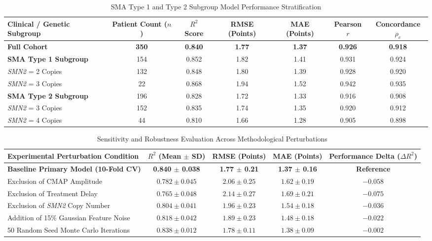 \documentclass[journal]{IEEEtran}
\begin{document}
\clearpage

\begin{table}[!t]
\caption{SMA Type 1 and Type 2 Subgroup Model Performance Stratification}
\label{tab:subgroup}
\centering
\begin{tabular}{lcccccc}
\toprule
\textbf{Clinical / Genetic Subgroup} & \textbf{Patient Count ($n$)} & \textbf{$R^2$ Score} & \textbf{RMSE (Points)} & \textbf{MAE (Points)} & \textbf{Pearson $r$} & \textbf{Concordance $\rho_c$} \\
\midrule
\textbf{Full Cohort} & \textbf{350} & \textbf{0.840} & \textbf{1.77} & \textbf{1.37} & \textbf{0.926} & \textbf{0.918} \\
\textbf{SMA Type 1 Subgroup} & 154 & 0.852 & 1.82 & 1.41 & 0.931 & 0.924 \\
\quad \textit{SMN2} = 2 Copies & 132 & 0.848 & 1.80 & 1.39 & 0.928 & 0.920 \\
\quad \textit{SMN2} = 3 Copies & 22 & 0.868 & 1.94 & 1.52 & 0.942 & 0.935 \\
\textbf{SMA Type 2 Subgroup} & 196 & 0.828 & 1.72 & 1.33 & 0.916 & 0.908 \\
\quad \textit{SMN2} = 3 Copies & 152 & 0.835 & 1.74 & 1.35 & 0.920 & 0.912 \\
\quad \textit{SMN2} = 4 Copies & 44 & 0.810 & 1.66 & 1.28 & 0.905 & 0.898 \\
\bottomrule
\end{tabular}
\end{table}

\begin{table}[!t]
\caption{Sensitivity and Robustness Evaluation Across Methodological Perturbations}
\label{tab:sensitivity}
\centering
\begin{tabular}{lcccc}
\toprule
\textbf{Experimental Perturbation Condition} & \textbf{$R^2$ (Mean $\pm$ SD)} & \textbf{RMSE (Points)} & \textbf{MAE (Points)} & \textbf{Performance Delta ($\Delta R^2$)} \\
\midrule
\textbf{Baseline Primary Model (10-Fold CV)} & \textbf{0.840 $\pm$ 0.038} & \textbf{1.77 $\pm$ 0.21} & \textbf{1.37 $\pm$ 0.16} & \textbf{Reference} \\
Exclusion of CMAP Amplitude & $0.782 \pm 0.045$ & $2.06 \pm 0.25$ & $1.62 \pm 0.19$ & $-0.058$ \\
Exclusion of Treatment Delay & $0.765 \pm 0.048$ & $2.14 \pm 0.27$ & $1.69 \pm 0.21$ & $-0.075$ \\
Exclusion of \textit{SMN2} Copy Number & $0.804 \pm 0.041$ & $1.96 \pm 0.23$ & $1.54 \pm 0.18$ & $-0.036$ \\
Addition of 15\% Gaussian Feature Noise & $0.818 \pm 0.042$ & $1.89 \pm 0.23$ & $1.48 \pm 0.18$ & $-0.022$ \\
50 Random Seed Monte Carlo Iterations & $0.838 \pm 0.012$ & $1.78 \pm 0.11$ & $1.38 \pm 0.09$ & $-0.002$ \\
\bottomrule
\end{tabular}
\end{table}
\end{document}
